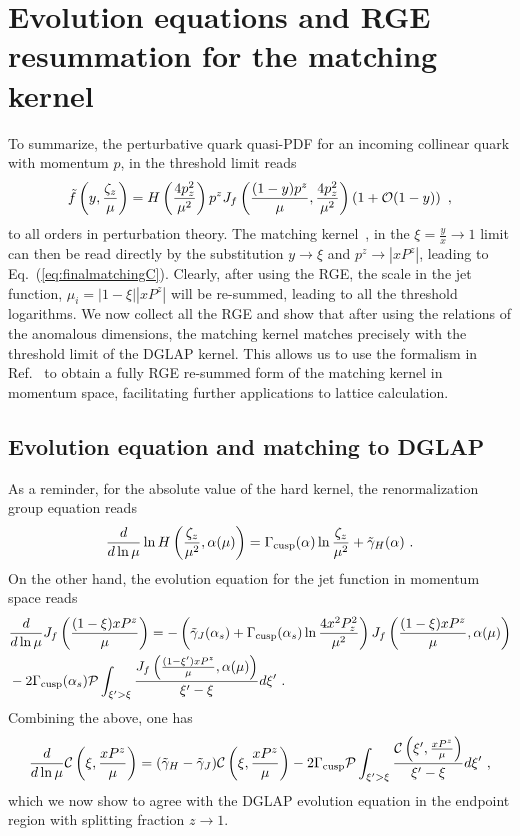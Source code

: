 \documentclass[a4paper,11pt]{article}
\begin{document}
\section{Evolution equations and RGE resummation for the matching kernel}\label{sec: evo}
To summarize, the perturbative quark quasi-PDF for an incoming collinear quark with momentum $p$, in the threshold limit reads
\begin{align}
\tilde f\left(y,\frac{\zeta_z}{\mu}\right)=H\left(\frac{4p_z^2}{\mu^2}\right)p^zJ_f\left(\frac{(1-y)p^z}{\mu},\frac{4p_z^2}{\mu^2}\right)\left(1+{\cal O}(1-y)\right) \ ,
\end{align}
to all orders in perturbation theory. The matching kernel~\cite{Ji:2014gla,Xiong:2013bka,Izubuchi:2018srq}, in the $\xi=\frac{y}{x}\rightarrow 1$ limit can then be read directly by the substitution $y\rightarrow \xi$ and $p^z \rightarrow |xP^z|$, leading to Eq.~(\ref{eq:finalmatchingC}).
Clearly, after using the RGE, the scale in the jet function, $\mu_i=|1-\xi||xP^z|$ will be re-summed, leading to all the threshold logarithms. We now collect all the RGE and show that after using the relations of the anomalous dimensions, the matching kernel matches precisely with the threshold limit of the DGLAP kernel. This allows us to use the formalism in Ref.~\cite{Becher:2006mr} to obtain a fully RGE re-summed form of the matching kernel in momentum space, facilitating further applications to lattice calculation. 

\subsection{Evolution equation and matching to DGLAP}
As a reminder, for the absolute value of the hard kernel, the renormalization group equation reads
\begin{align}
\frac{d}{d\ln \mu} \ln H\left(\frac{\zeta_z}{\mu^2},\alpha(\mu)\right)=\Gamma_{\rm cusp}(\alpha)\ln\frac{\zeta_z}{\mu^2}+\tilde {\gamma}_{H}(\alpha) \ .
\end{align}
On the other hand, the evolution equation for the jet function in momentum space reads
\begin{align}
&\frac{d}{d\ln \mu} J_{f}\left(\frac{(1-\xi)xP^z}{\mu}\right)=-\left(\tilde \gamma_{J}(\alpha_s)+\Gamma_{\rm cusp}(\alpha_s)\ln \frac{4x^2 P_z^2}{\mu^2}\right)J_f\left(\frac{(1-\xi)xP^z}{\mu},\alpha(\mu)\right)
\nonumber \\ 
&-2\Gamma_{\rm cusp}(\alpha_s){\cal P}\int_{\xi'>\xi} \frac{J_{f}\left(\frac{(1-\xi')x P^z}{\mu},\alpha(\mu)\right)}{\xi'-\xi}d\xi' \ .\end{align}
Combining the above, one has
\begin{align}\label{eq:evoC}
\frac{d}{d\ln \mu}{\cal C}\left(\xi,\frac{xP^z}{\mu}\right)=(\tilde \gamma_{H}-\tilde \gamma_{J}){\cal C}\left(\xi,\frac{xP^z}{\mu}\right)-2\Gamma_{\rm cusp}{\cal P}\int_{\xi'>\xi} \frac{{\cal C}\left(\xi', \frac{xP^z}{\mu}\right)}{\xi'-\xi}d\xi' \ ,
\end{align}
which we now show to agree with the DGLAP evolution equation in the endpoint region with splitting fraction $z\rightarrow 1$.
\end{document}
